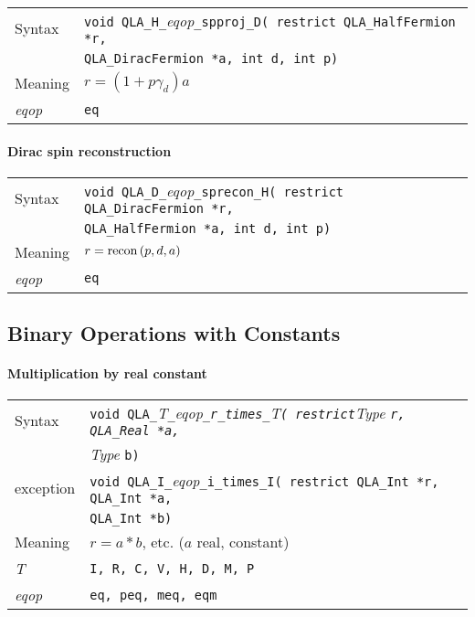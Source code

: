\documentclass{article}
\newcommand{\tInt}{QLA\ttdash Int }
\newcommand{\tHalfFermion}{QLA\ttdash HalfFermion }
\newcommand{\tDiracFermion}{QLA\ttdash DiracFermion }
\newcommand{\tqlaReal}{QLA\ttdash Real }
\newcommand{\tqlaInt}{QLA\ttdash Int }
\newcommand{\namespace}{QLA}
\newcommand{\allEqOps}{{\tt eq, peq, meq, eqm}}
\newcommand{\allNumericTypes}{{\tt I, R, C, V, H, D, M, P}}
\newcommand{\ttdash}{{\tt \_}}
\newcommand{\itt}{\it T}
\newcommand{\extraarg}{}
\begin{document}
\begin{flushleft}
  \begin{tabular}{|l|l|}
  \hline
  Syntax      & {\tt void \namespace}\ttdash{\tt H}\ttdash{\it eqop}\ttdash{\tt spproj}\ttdash{\tt D( restrict \tHalfFermion *r,}\\
              & {\tt \tDiracFermion *a, int d, int p\extraarg)} \\
  \hline
  Meaning     & $r = (1 + p\gamma_d)a$\\
  \hline
  {\it eqop}  & {\tt eq} \\
  \hline
  \end{tabular}
\end{flushleft}

\paragraph{Dirac spin reconstruction}

\begin{flushleft}
  \begin{tabular}{|l|l|}
  \hline
  Syntax      & {\tt void \namespace}\ttdash{\tt D}\ttdash{\it eqop}\ttdash{\tt sprecon}\ttdash{\tt H( restrict \tDiracFermion *r,}\\
              & {\tt \tHalfFermion *a, int d, int p\extraarg)} \\
  \hline
  Meaning     & $r = {\rm recon\,}(p,d,a)$\\
  \hline
  {\it eqop}  & {\tt eq} \\
  \hline
  \end{tabular}
\end{flushleft}

\subsection{Binary Operations with Constants}

\paragraph{Multiplication by real constant}

\begin{flushleft}
  \begin{tabular}{|l|l|}
  \hline
  Syntax      & {\tt void \namespace}\ttdash\itt\ttdash{\it eqop}\ttdash{\tt r}\ttdash{\tt times}\ttdash\itt{\tt ( restrict}{\it Type }{\tt *r, \tqlaReal *a,}\\
              & {\it Type }{\tt *b\extraarg)} \\
  exception    & {\tt void \namespace}\ttdash{\tt I}\ttdash{\it eqop}\ttdash{\tt i}\ttdash{\tt times}\ttdash{\tt I( restrict \tInt *r, \tqlaInt *a,}\\
              & {\tt \tInt *b\extraarg)} \\
  \hline
  Meaning     & $r = a*b$, etc. ($a$ real, constant)
$
$\\
  \hline
  \itt     & \allNumericTypes \\
  \hline
  {\it eqop}  & \allEqOps \\
  \hline
  \end{tabular}
\end{flushleft}
\end{document}
